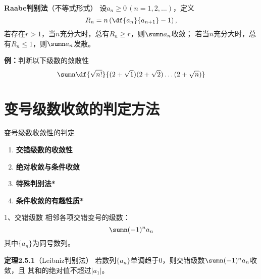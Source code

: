 \begin{frame}
	\linespread{1.2}
	\begin{block}{{\bf Raabe判别法}（不等式形式）\hfill}
		设$a_n\geq 0\,(n=1,2,\ldots)$，定义
		$$R_n=n\left(\df{a_n}{a_{n+1}}-1\right),$$
		\vspace{-1ex}
		若存在$r>1$，当$n$充分大时，总有$R_n\geq r$，则$\sumn a_n$收敛；
		若当$n$充分大时，总有$R_n\leq 1$，则$\sumn a_n$发散。
		\pause 
	\end{block}
	\begin{exampleblock}{{\bf 例：}判断以下级数的敛散性\hfill}
		 $$\sumn\df{\sqrt{n!}}{(2+\sqrt 1)(2+\sqrt 2)\ldots(2+\sqrt n)}$$
	\end{exampleblock}
\end{frame}

\section{变号级数收敛的判定方法}

\begin{frame}{变号级数收敛性的判定}
	\linespread{2}
	\begin{enumerate}\pause
	  \item {\bf 交错级数的收敛性}\pause
	  \item {\bf 绝对收敛与条件收敛}\pause
	  \item {\bf 特殊判别法*}\pause
	  \item {\bf 条件收敛的有趣性质*}
	\end{enumerate}
\end{frame}

\begin{frame}{1、交错级数}
	\linespread{1.2}\pause
	相邻各项交错变号的级数：\pause 
	$$\sumn(-1)^na_n$$
	其中$\{a_n\}$为同号数列。\pause 
	\begin{block}{{\bf 定理2.5.1}（Leibniz判别法）\hfill}\pause 
		若数列$\{a_n\}$单调趋于$0$，则交错级数$\sumn (-1)^na_n$收敛，且
		其和的绝对值不超过$|a_1|$。\pause 
	\end{block}
\end{frame}

